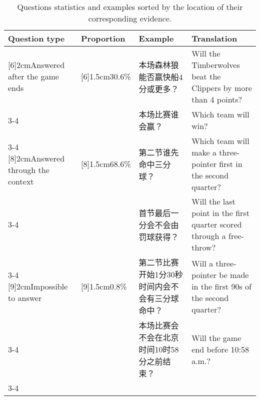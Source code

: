 \begin{CJK}{UTF8}{gbsn}
\begin{table*}[t!]
\centering
\begin{tabular}{|p{2cm}|p{1.5cm}|p{4cm}|p{4.5cm}|}
\hline
Question type&Proportion&Example&Translation\\
\hline
\centering
\multirow{2}[6]{2cm}{Answered after the game ends}&
\centering
\multirow{2}[6]{1.5cm}{30.6\%}&
本场森林狼能否赢快船4分或更多？&Will the Timberwolves beat the Clippers by more than 4 points?\\
\cline{3-4}
& &本场比赛谁会赢？&Which team will win?\\
\cline{3-4}
\hline
\multirow{2}[8]{2cm}{Answered through the context}&
\centering
\multirow{2}[8]{1.5cm}{68.6\%}&
第二节谁先命中三分球？&Which team will make a three-pointer first in the second quarter?\\
\cline{3-4}
& &首节最后一分会不会由罚球获得？&Will the last point in the first quarter scored through a free-throw?\\
\cline{3-4}
\hline
\multirow{2}[9]{2cm}{Impossible to answer}&
\centering
\multirow{2}[9]{1.5cm}{0.8\%}&
第二节比赛开始1分30秒时间内会不会有三分球命中？&Will a three-pointer be made in the first 90s of the second quarter?\\
\cline{3-4}
& &本场比赛会不会在北京时间10时58分之前结束？&Will the game end before 10:58 a.m.?\\
\cline{3-4}
\hline
\end{tabular}
\caption{Questions statistics and examples sorted by the location of their corresponding evidence.}
\label{loc}
\end{table*}
\end{CJK}

